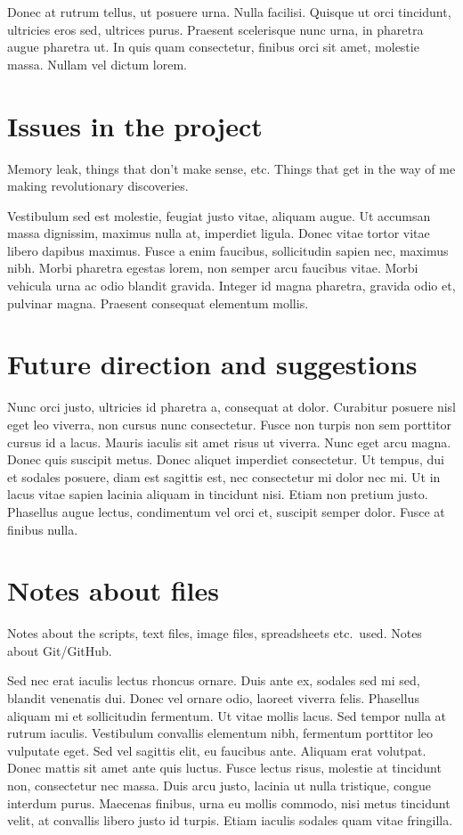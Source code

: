 \documentclass[parskip=full]{scrreprt}
\begin{document}
Donec at rutrum tellus, ut posuere urna. Nulla facilisi. Quisque ut orci tincidunt, ultricies eros sed, ultrices purus. Praesent scelerisque nunc urna, in pharetra augue pharetra ut. In quis quam consectetur, finibus orci sit amet, molestie massa. Nullam vel dictum lorem. 

\section{Issues in the project}
\label{sec:issues}

Memory leak, things that don't make sense, etc. Things that get in the way of me making revolutionary discoveries.

Vestibulum sed est molestie, feugiat justo vitae, aliquam augue. Ut accumsan massa dignissim, maximus nulla at, imperdiet ligula. Donec vitae tortor vitae libero dapibus maximus. Fusce a enim faucibus, sollicitudin sapien nec, maximus nibh. Morbi pharetra egestas lorem, non semper arcu faucibus vitae. Morbi vehicula urna ac odio blandit gravida. Integer id magna pharetra, gravida odio et, pulvinar magna. Praesent consequat elementum mollis.

\section{Future direction and suggestions}
\label{sec:future}

Nunc orci justo, ultricies id pharetra a, consequat at dolor. Curabitur posuere nisl eget leo viverra, non cursus nunc consectetur. Fusce non turpis non sem porttitor cursus id a lacus. Mauris iaculis sit amet risus ut viverra. Nunc eget arcu magna. Donec quis suscipit metus. Donec aliquet imperdiet consectetur. Ut tempus, dui et sodales posuere, diam est sagittis est, nec consectetur mi dolor nec mi. Ut in lacus vitae sapien lacinia aliquam in tincidunt nisi. Etiam non pretium justo. Phasellus augue lectus, condimentum vel orci et, suscipit semper dolor. Fusce at finibus nulla.

\section{Notes about files}
\label{sec:files}

Notes about the scripts, text files, image files, spreadsheets etc.\ used. Notes about Git/GitHub.

Sed nec erat iaculis lectus rhoncus ornare. Duis ante ex, sodales sed mi sed, blandit venenatis dui. Donec vel ornare odio, laoreet viverra felis. Phasellus aliquam mi et sollicitudin fermentum. Ut vitae mollis lacus. Sed tempor nulla at rutrum iaculis. Vestibulum convallis elementum nibh, fermentum porttitor leo vulputate eget. Sed vel sagittis elit, eu faucibus ante. Aliquam erat volutpat. Donec mattis sit amet ante quis luctus. Fusce lectus risus, molestie at tincidunt non, consectetur nec massa. Duis arcu justo, lacinia ut nulla tristique, congue interdum purus. Maecenas finibus, urna eu mollis commodo, nisi metus tincidunt velit, at convallis libero justo id turpis. Etiam iaculis sodales quam vitae fringilla. 
\end{document}
